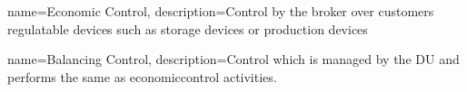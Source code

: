 
{
	name=Economic Control,
	description={Control by the broker over customers regulatable devices such as storage devices or production devices}
}

{
	name=Balancing Control,
	description={Control which is managed by the \ac{DU} and performs the same as \gls{economiccontrol} activities.}
}


